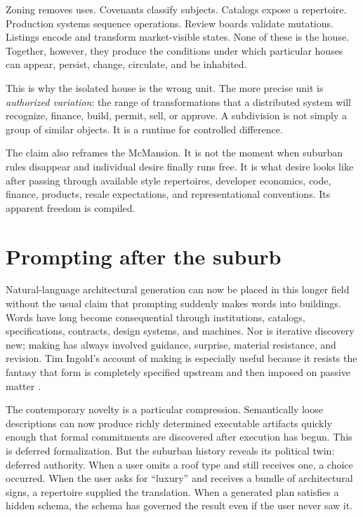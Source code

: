 \documentclass[11pt]{article}
\begin{document}
Zoning removes uses. Covenants classify subjects. Catalogs expose a repertoire. Production systems sequence operations. Review boards validate mutations. Listings encode and transform market-visible states. None of these is the house. Together, however, they produce the conditions under which particular houses can appear, persist, change, circulate, and be inhabited.

This is why the isolated house is the wrong unit. The more precise unit is \emph{authorized variation}: the range of transformations that a distributed system will recognize, finance, build, permit, sell, or approve. A subdivision is not simply a group of similar objects. It is a runtime for controlled difference.

The claim also reframes the McMansion. It is not the moment when suburban rules disappear and individual desire finally runs free. It is what desire looks like after passing through available style repertoires, developer economics, code, finance, products, resale expectations, and representational conventions. Its apparent freedom is compiled.

\section{Prompting after the suburb}
Natural-language architectural generation can now be placed in this longer field without the usual claim that prompting suddenly makes words into buildings. Words have long become consequential through institutions, catalogs, specifications, contracts, design systems, and machines. Nor is iterative discovery new; making has always involved guidance, surprise, material resistance, and revision. Tim Ingold's account of making is especially useful because it resists the fantasy that form is completely specified upstream and then imposed on passive matter \citep{ingold2013making}.

The contemporary novelty is a particular compression. Semantically loose descriptions can now produce richly determined executable artifacts quickly enough that formal commitments are discovered after execution has begun. This is deferred formalization. But the suburban history reveals its political twin: deferred authority. When a user omits a roof type and still receives one, a choice occurred. When the user asks for ``luxury'' and receives a bundle of architectural signs, a repertoire supplied the translation. When a generated plan satisfies a hidden schema, the schema has governed the result even if the user never saw it.
\end{document}
